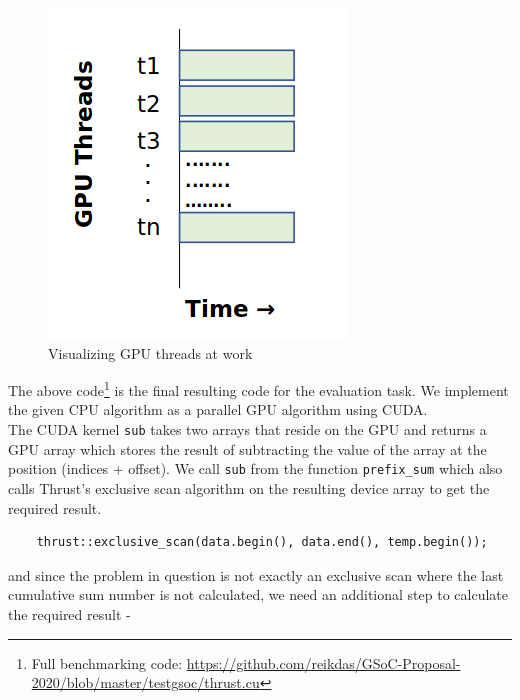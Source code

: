 \documentclass{article}
\begin{document}
\begin{figure}[H]
\hfill\includegraphics[scale=0.72]{Graphics/gpu.PNG}\hspace*{\fill}
\caption{Visualizing GPU threads at work}
\end{figure}
\begin{mdframed}[backgroundcolor=light-gray, roundcorner=10pt,leftmargin=0.5, rightmargin=0.5, innertopmargin=1,innerbottommargin=1, outerlinewidth=1, linecolor=light-gray]

\end{mdframed}
The above code\footnote{Full benchmarking code: \url{https://github.com/reikdas/GSoC-Proposal-2020/blob/master/testgsoc/thrust.cu}} is the final resulting code for the evaluation task. We implement the given CPU algorithm as a parallel GPU algorithm using CUDA.\\
\noindent The CUDA kernel \texttt{sub} takes two arrays that reside on the GPU and returns a GPU array which stores the result of subtracting the value of the array at the position (indices + offset). We call \texttt{sub} from the function \texttt{prefix_sum} which also calls Thrust's exclusive scan \cite{scan} algorithm on the resulting device array to get the required result.
\begin{mdframed}[backgroundcolor=light-gray, roundcorner=10pt,leftmargin=0.5, rightmargin=0.5, innertopmargin=1,innerbottommargin=1, outerlinewidth=1, linecolor=light-gray]
\begin{lstlisting}
    thrust::exclusive_scan(data.begin(), data.end(), temp.begin());
\end{lstlisting}
\end{mdframed}
and since the problem in question is not exactly an exclusive scan where the last cumulative sum number is not calculated, we need an additional step to calculate the required result -
\end{document}
